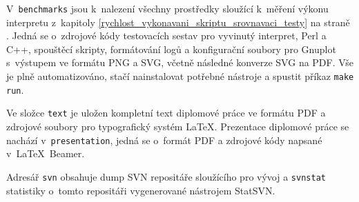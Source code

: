 \documentclass[11pt,twoside,a4paper]{book}
\begin{document}
V~\texttt{benchmarks} jsou k~nalezení všechny prostředky sloužící k~měření výkonu interpretu z~kapitoly \ref{rychlost_vykonavani_skriptu_srovnavaci_testy} na straně \pageref{rychlost_vykonavani_skriptu_srovnavaci_testy}. Jedná se o~zdrojové kódy testovacích sestav pro vyvinutý interpret, Perl a C++, spouštěcí skripty, formátování logů a konfigurační soubory pro Gnuplot s~výstupem ve formátu PNG a SVG, včetně následné konverze SVG na PDF. Vše je plně automatizováno, stačí nainstalovat potřebné nástroje a spustit příkaz \texttt{make run}.

Ve složce \texttt{text} je uložen kompletní text diplomové práce ve formátu PDF a zdrojové soubory pro typografický systém \LaTeX. Prezentace diplomové práce se nachází v~\texttt{presentation}, jedná se o~formát PDF a zdrojové kódy napsané v~\LaTeX~Beamer.

Adresář \texttt{svn} obsahuje dump SVN repositáře sloužícího pro vývoj a \texttt{svnstat} statistiky o~tomto repositáři vygenerované nástrojem StatSVN.
\end{document}
